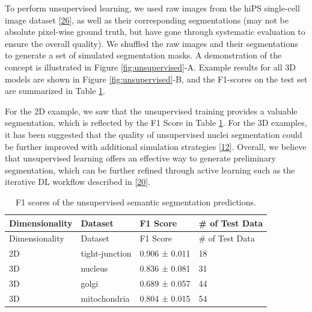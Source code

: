 To perform unsupervised learning, we used raw images from the hiPS single-cell image dataset {[}\protect\hyperlink{ref-5sGcmDuy}{26}{]}, as well as their corresponding segmentations (may not be absolute pixel-wise ground truth, but have gone through systematic evaluation to ensure the overall quality). We shuffled the raw images and their segmentations to generate a set of simulated segmentation masks. A demonstration of the concept is illustrated in Figure \ref{fig:unsupervised}-A. Example results for all 3D models are shown in Figure \ref{fig:unsupervised}-B, and the F1-scores on the test set are summarized in Table \ref{tbl:unsuper}.

For the 2D example, we saw that the unsupervised training provides a valuable segmentation, which is reflected by the F1 Score in Table \ref{tbl:unsuper}. For the 3D examples, it has been suggested that the quality of unsupervised nuclei segmentation could be further improved with additional simulation strategies {[}\protect\hyperlink{ref-RuFP3CS3}{12}{]}. Overall, we believe that unsupervised learning offers an effective way to generate preliminary segmentation, which can be further refined through active learning such as the iterative DL workflow described in {[}\protect\hyperlink{ref-jM3v1UjQ}{20}{]}.

\begin{longtable}[]{@{}llll@{}}
\caption{F1 scores of the unsupervised semantic segmentation predictions. \label{tbl:unsuper}}\label{tbl:unsuper}\tabularnewline
\toprule()
Dimensionality & Dataset & F1 Score & \# of Test Data \\
\midrule()
\endfirsthead
\toprule()
Dimensionality & Dataset & F1 Score & \# of Test Data \\
\midrule()
\endhead
2D & tight-junction & 0.906 ± 0.011 & 18 \\
3D & nucleus & 0.836 ± 0.081 & 31 \\
3D & golgi & 0.689 ± 0.057 & 44 \\
3D & mitochondria & 0.804 ± 0.015 & 54 \\
\bottomrule()
\end{longtable}

